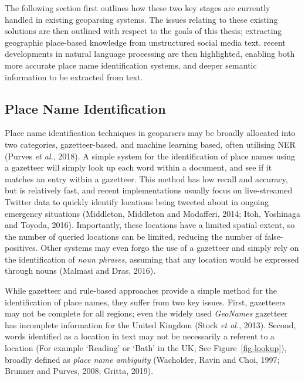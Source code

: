 \documentclass[
  letterpaper,
  11pt,
  english,
  onehalfspacing,
  headsepline]{MastersDoctoralThesis}
\begin{document}
The following section first outlines how these two key stages are
currently handled in existing geoparsing systems. The issues relating to
these existing solutions are then outlined with respect to the goals of
this thesis; extracting geographic place-based knowledge from
unstructured social media text. recent developments in natural language
processing are then highlighted, enabling both more accurate place name
identification systems, and deeper semantic information to be extracted
from text.

\hypertarget{place-name-identification}{%
\subsection{Place Name Identification}\label{place-name-identification}}

Place name identification techniques in geoparsers may be broadly
allocated into two categories, gazetteer-based, and machine learning
based, often utilising NER (Purves \emph{et al.}, 2018). A simple system
for the identification of place names using a gazetteer will simply look
up each word within a document, and see if it matches an entry within a
gazetteer. This method has low recall and accuracy, but is relatively
fast, and recent implementations usually focus on live-streamed Twitter
data to quickly identify locations being tweeted about in ongoing
emergency situations (Middleton, Middleton and Modafferi, 2014; Itoh,
Yoshinaga and Toyoda, 2016). Importantly, these locations have a limited
spatial extent, so the number of queried locations can be limited,
reducing the number of false-positives. Other systems may even forgo the
use of a gazetteer and simply rely on the identification of \emph{noun
phrases}, assuming that any location would be expressed through nouns
(Malmasi and Dras, 2016).

While gazetteer and rule-based approaches provide a simple method for
the identification of place names, they suffer from two key issues.
First, gazetteers may not be complete for all regions; even the widely
used \emph{GeoNames} gazetteer has incomplete information for the United
Kingdom (Stock \emph{et al.}, 2013). Second, words identified as a
location in text may not be necessarily a referent to a location (For
example `Reading' or `Bath' in the UK; See Figure~\ref{fig-lookup}),
broadly defined as \emph{place name ambiguity} (Wacholder, Ravin and
Choi, 1997; Brunner and Purves, 2008; Gritta, 2019).
\end{document}
